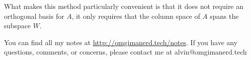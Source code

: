 \documentclass{math}
\begin{document}
What makes this method particularly convenient is that it does not require
an orthogonal basis for \( A \), it only requires that the column space of
\( A \) spans the subspace \( W \).

\begin{center}
  You can find all my notes at \url{http://omgimanerd.tech/notes}. If you have
  any questions, comments, or concerns, please contact me at
  alvin@omgimanerd.tech
\end{center}
\end{document}
